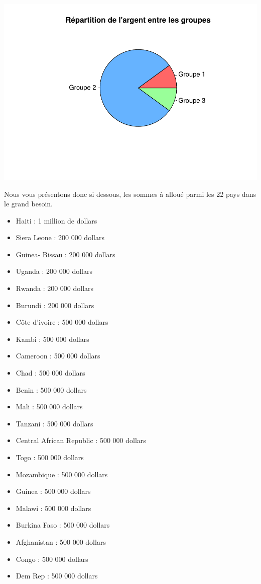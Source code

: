 \documentclass[
]{article}
\providecommand{\tightlist}{%
  \setlength{\itemsep}{0pt}\setlength{\parskip}{0pt}}
\begin{document}
\includegraphics{Projet_files/figure-latex/unnamed-chunk-48-1.pdf}

Nous vous présentons donc si dessous, les sommes à alloué parmi les 22
pays dans le grand besoin.

\begin{itemize}
\tightlist
\item
  Haiti : 1 million de dollars
\item
  Siera Leone : 200 000 dollars
\item
  Guinea- Bissau : 200 000 dollars
\item
  Uganda : 200 000 dollars
\item
  Rwanda : 200 000 dollars
\item
  Burundi : 200 000 dollars
\item
  Côte d'ivoire : 500 000 dollars
\item
  Kambi : 500 000 dollars
\item
  Cameroon : 500 000 dollars
\item
  Chad : 500 000 dollars
\item
  Benin : 500 000 dollars
\item
  Mali : 500 000 dollars
\item
  Tanzani : 500 000 dollars
\item
  Central African Republic : 500 000 dollars
\item
  Togo : 500 000 dollars
\item
  Mozambique : 500 000 dollars
\item
  Guinea : 500 000 dollars
\item
  Malawi : 500 000 dollars
\item
  Burkina Faso : 500 000 dollars
\item
  Afghanistan : 500 000 dollars
\item
  Congo : 500 000 dollars
\item
  Dem Rep : 500 000 dollars
\end{itemize}
\end{document}
